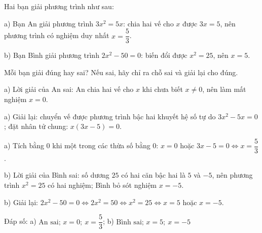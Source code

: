 \begin{problem}[9DS-PT2-021]
Hai bạn giải phương trình như sau:

a) Bạn An giải phương trình $3x^2 = 5x$: chia hai vế cho $x$ được $3x = 5$, nên phương trình có nghiệm duy nhất $x = \dfrac{5}{3}$.

b) Bạn Bình giải phương trình $2x^2 - 50 = 0$: biến đổi được $x^2 = 25$, nên $x = 5$.

Mỗi bạn giải đúng hay sai? Nếu sai, hãy chỉ ra chỗ sai và giải lại cho đúng.

\begin{solution}
a) Lời giải của An sai: An chia hai vế cho $x$ khi chưa biết $x \neq 0$, nên làm mất nghiệm $x = 0$.

a) Giải lại: chuyển vế được phương trình bậc hai khuyết hệ số tự do $3x^2 - 5x = 0$; đặt nhân tử chung: $x(3x - 5) = 0$.

a) Tích bằng $0$ khi một trong các thừa số bằng $0$: $x = 0$ hoặc $3x - 5 = 0 \Leftrightarrow x = \dfrac{5}{3}$.

b) Lời giải của Bình sai: số dương $25$ có hai căn bậc hai là $5$ và $-5$, nên phương trình $x^2 = 25$ có hai nghiệm; Bình bỏ sót nghiệm $x = -5$.

b) Giải lại: $2x^2 - 50 = 0 \Leftrightarrow 2x^2 = 50 \Leftrightarrow x^2 = 25 \Leftrightarrow x = 5$ hoặc $x = -5$.

Đáp số: a) $\boxed{\text{An sai; } x = 0;\ x = \dfrac{5}{3}}$; b) $\boxed{\text{Bình sai; } x = 5;\ x = -5}$
\end{solution}
\end{problem}

